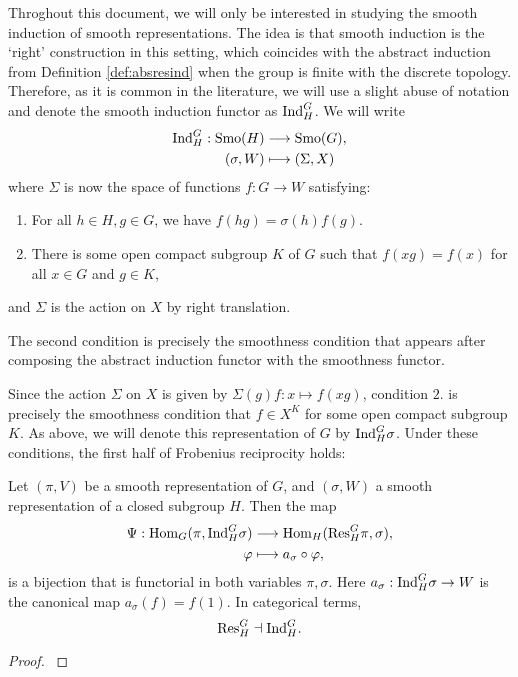 \begin{rem}
    Throghout this document, we will only be interested in studying the smooth induction of smooth representations. The idea is that smooth induction is the `right' construction in this setting, which coincides with the abstract induction from Definition \ref{def:absresind} when the group is finite with the discrete topology. Therefore, as it is common in the literature, we will use a slight abuse of notation and denote the smooth induction functor as $\mathrm{Ind}_H^G$. We will write 
    \begin{align*}
        \mathrm{Ind}_H^G:\mathrm{Smo}(H)&\longrightarrow\mathrm{Smo}(G),\\
        (\sigma,W)&\longmapsto(\Sigma,X)
    \end{align*}
    where $\Sigma$ is now the space of functions $f:G\to W$ satisfying:
    \begin{enumerate}
        \item For all $h\in H, g\in G$, we have $f(hg) = \sigma(h)f(g)$.
        \item There is some open compact subgroup $K$ of $G$ such that $f(xg)=f(x)$ for all $x\in G$ and $g\in K$,
    \end{enumerate}
    and $\Sigma$ is the action on $X$ by right translation.

    The second condition is precisely the smoothness condition that appears after composing the abstract induction functor with the smoothness functor.
    
\end{rem}

Since the action $\Sigma$ on $X$ is given by $\Sigma(g)f:x\mapsto f(xg)$, condition $2.$ is precisely the smoothness condition that $f\in X^K$ for some open compact subgroup $K$. As above, we will denote this representation of $G$ by $\mathrm{Ind}_H^G\sigma$. Under these conditions, the first half of Frobenius reciprocity holds:

\begin{thm}\label{thm:frob}
	Let $(\pi,V)$ be a smooth representation of $G$, and $(\sigma,W)$ a smooth representation of a closed subgroup $H$. Then the map
	\begin{align*}
		\Psi:\mathrm{Hom}_G(\pi, \mathrm{Ind}_H^G\sigma)&\longrightarrow \mathrm{Hom}_H(\mathrm{Res}_H^G \pi, \sigma),\\
		\varphi &\longmapsto a_\sigma \circ \varphi,
	\end{align*}
    is a bijection that is functorial in both variables $\pi,\sigma$. Here $a_\sigma:\mathrm{Ind}_H^G\sigma \to W$ is the canonical map $a_\sigma(f) = f(1)$. In categorical terms,
    $$\mathrm{Res}_H^G\dashv\mathrm{Ind}_H^G.$$
\end{thm}
\begin{proof}
    \cite[2.4 Frobenius Reciprocity]{BH1}
\end{proof}

